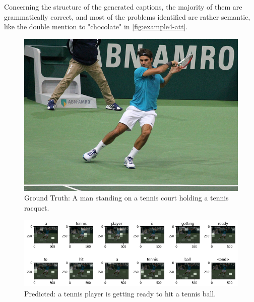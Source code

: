 Concerning the structure of the generated captions, the majority of them are grammatically correct, and most of the problems identified are rather semantic, like the double mention to "chocolate" in \cref{fig:example4-att}.

\newpage


\begin{figure}[t!]
    \centering
    \includegraphics[width=13cm]{images/ch5/example1.png}
    \caption{Ground Truth: A man standing on a tennis court holding a tennis racquet.}
    \label{fig:example1}
\end{figure}

\begin{figure}[b!]
    \centering
    \includegraphics[width=15cm]{images/ch5/example1-attention.png}
    \caption{Predicted: a tennis player is getting ready to hit a tennis ball.}
    \label{fig:example1-att}
\end{figure}


